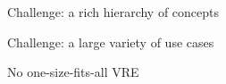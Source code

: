 \documentclass{beamer}
\begin{document}
\begin{frame}{Challenge: a rich hierarchy of concepts}

  \begin{bigcenter}
  \end{bigcenter}
  \vfill
\end{frame}

\begin{frame}{Challenge: a large variety of use cases}

  No one-size-fits-all VRE

\end{frame}
\end{document}

